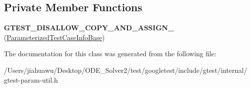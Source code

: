 \subsection*{Private Member Functions}
\begin{DoxyCompactItemize}
\item 
\mbox{\label{classtesting_1_1internal_1_1_parameterized_test_case_info_base_a67505987d1b00a12deb259093797c967}} 
{\bfseries G\+T\+E\+S\+T\+\_\+\+D\+I\+S\+A\+L\+L\+O\+W\+\_\+\+C\+O\+P\+Y\+\_\+\+A\+N\+D\+\_\+\+A\+S\+S\+I\+G\+N\+\_\+} (\mbox{\hyperlink{classtesting_1_1internal_1_1_parameterized_test_case_info_base}{Parameterized\+Test\+Case\+Info\+Base}})
\end{DoxyCompactItemize}


The documentation for this class was generated from the following file\+:\begin{DoxyCompactItemize}
\item 
/\+Users/jiahuawu/\+Desktop/\+O\+D\+E\+\_\+\+Solver2/test/googletest/include/gtest/internal/gtest-\/param-\/util.\+h\end{DoxyCompactItemize}
